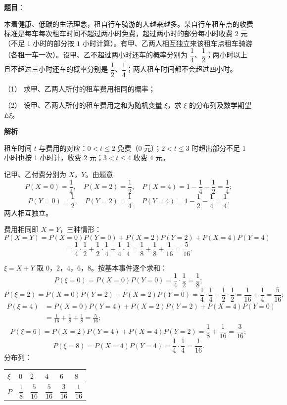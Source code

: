 \begin{answer}

\textbf{题目}：

本着健康、低碳的生活理念，租自行车骑游的人越来越多。某自行车租车点的收费标准是每车每次租车时间不超过两小时免费，超过两小时的部分每小时收费 $2$ 元（不足 $1$ 小时的部分按 $1$ 小时计算）。有甲、乙两人相互独立来该租车点租车骑游（各租一车一次）。设甲、乙不超过两小时还车的概率分别为 $\dfrac14$、$\dfrac12$；两小时以上且不超过三小时还车的概率分别是 $\dfrac12$、$\dfrac14$；两人租车时间都不会超过四小时。

（1） 求甲、乙两人所付的租车费用相同的概率；

（2） 设甲、乙两人所付的租车费用之和为随机变量 $\xi$，求 $\xi$ 的分布列及数学期望 $E\xi$。

\textbf{解析}

租车时间 $t$ 与费用的对应：$0<t\leqslant2$ 免费（$0$ 元）；$2<t\leqslant3$ 时超出部分不足 $1$ 小时也按 $1$ 小时计，收费 $2$ 元；$3<t\leqslant4$ 收费 $4$ 元。

记甲、乙付费分别为 $X$，$Y$。由题意
\nopagebreak[4]
\[P(X=0)=\frac14,\quad P(X=2)=\frac12,\quad P(X=4)=1-\frac14-\frac12=\frac14;\]
\nopagebreak[4]
\[P(Y=0)=\frac12,\quad P(Y=2)=\frac14,\quad P(Y=4)=1-\frac12-\frac14=\frac14.\]
两人相互独立。

费用相同即 $X=Y$，三种情形：
\nopagebreak[4]
\[P(X=Y)=P(X=0)P(Y=0)+P(X=2)P(Y=2)+P(X=4)P(Y=4)\]
\nopagebreak[4]
\[=\frac14\cdot\frac12+\frac12\cdot\frac14+\frac14\cdot\frac14=\frac18+\frac18+\frac1{16}=\frac5{16}.\]

$\xi=X+Y$ 取 $0$，$2$，$4$，$6$，$8$。按基本事件逐个求和：
\nopagebreak[4]
\[P(\xi=0)=P(X=0)P(Y=0)=\frac14\cdot\frac12=\frac18;\]
\nopagebreak[4]
\[P(\xi=2)=P(X=0)P(Y=2)+P(X=2)P(Y=0)=\frac14\cdot\frac14+\frac12\cdot\frac12=\frac1{16}+\frac14=\frac5{16};\]
\nopagebreak[4]
\[
\begin{aligned}
P(\xi=4)&=P(X=0)P(Y=4)+P(X=2)P(Y=2)+P(X=4)P(Y=0)\\
&=\frac1{16}+\frac18+\frac18=\frac5{16};
\end{aligned}
\]
\nopagebreak[4]
\[P(\xi=6)=P(X=2)P(Y=4)+P(X=4)P(Y=2)=\frac18+\frac1{16}=\frac3{16};\]
\nopagebreak[4]
\[P(\xi=8)=P(X=4)P(Y=4)=\frac14\cdot\frac14=\frac1{16}.\]
分布列：

\begin{center}
\begin{tabular}{llllll}
\toprule
$\xi$ & $0$ & $2$ & $4$ & $6$ & $8$ \\
\midrule
$P$ & $\dfrac18$ & $\dfrac5{16}$ & $\dfrac5{16}$ & $\dfrac3{16}$ & $\dfrac1{16}$ \\
\bottomrule
\end{tabular}
\end{center}


\end{answer}
